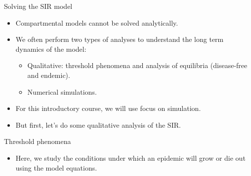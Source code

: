 \documentclass[
  ignorenonframetext,
]{beamer}
\providecommand{\tightlist}{%
  \setlength{\itemsep}{0pt}\setlength{\parskip}{0pt}}\usepackage{longtable,booktabs,array}
\begin{document}
\begin{frame}
\begin{block}{Solving the SIR model}
\label{solving-the-sir-model}
\begin{itemize}
\item
  Compartmental models cannot be solved analytically.
\item
  We often perform two types of analyses to understand the {long term
  dynamics} of the model:

  \begin{itemize}
  \tightlist
  \item
    Qualitative: threshold phenomena and analysis of equilibria
    (disease-free and endemic).\\
  \item
    Numerical simulations.
  \end{itemize}
\end{itemize}

\begin{tcolorbox}[enhanced jigsaw, colframe=quarto-callout-note-color-frame, toprule=.15mm, opacitybacktitle=0.6, breakable, colback=white, leftrule=.75mm, left=2mm, opacityback=0, titlerule=0mm, bottomtitle=1mm, toptitle=1mm, title=\textcolor{quarto-callout-note-color}{\faInfo}\hspace{0.5em}{Note}, bottomrule=.15mm, arc=.35mm, coltitle=black, colbacktitle=quarto-callout-note-color!10!white, rightrule=.15mm]

\begin{itemize}
\tightlist
\item
  For this introductory course, we will use focus on simulation.
\end{itemize}

\end{tcolorbox}

\begin{itemize}
\tightlist
\item
  But first, let's do some qualitative analysis of the SIR.
\end{itemize}
\end{block}
\end{frame}

\begin{frame}
\begin{block}{Threshold phenomena}
\label{threshold-phenomena}
\begin{itemize}
\tightlist
\item
  Here, we study the conditions under which an epidemic will {grow or
  die out} using the model equations.
\end{itemize}
\end{block}
\end{frame}
\end{document}
